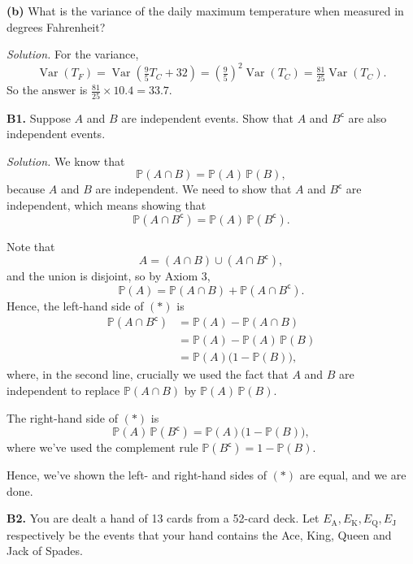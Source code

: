 \documentclass[
  a4paper,
]{book}
\theoremstyle{definition}
\theoremstyle{definition}
\theoremstyle{definition}
\theoremstyle{definition}
\theoremstyle{remark}
\begin{document}
\textbf{(b)} What is the variance of the daily maximum temperature when measured in degrees Fahrenheit?

\begin{myanswers}
\emph{Solution.}
For the variance,
\[ \operatorname{Var}(T_F) = \operatorname{Var}\left(\tfrac95T_C + 32\right) = \left(\tfrac95\right)^2 \operatorname{Var}(T_C) = \tfrac{81}{25}\operatorname{Var}(T_C). \]
So the answer is \(\frac{81}{25} \times 10.4 = 33.7\).

\end{myanswers}

\textbf{B1.} Suppose \(A\) and \(B\) are independent events. Show that \(A\) and \(B^\mathsf{c}\) are also independent events.

\begin{myanswers}
\emph{Solution.} We know that
\[ \mathbb P(A \cap B) = \mathbb P(A) \, \mathbb P(B) , \]
because \(A\) and \(B\) are independent.
We need to show that \(A\) and \(B^\mathsf{c}\) are independent, which means showing that
\[ \mathbb P(A \cap B^\mathsf{c}) = \mathbb P(A) \, \mathbb P(B^\mathsf{c}) . \tag{$*$} \]

Note that
\[ A = (A \cap B) \cup (A \cap B^\mathsf{c}) , \]
and the union is disjoint, so by Axiom 3,
\[ \mathbb P(A) = \mathbb P(A \cap B) + \mathbb P(A \cap B^\mathsf{c}) . \]
Hence, the left-hand side of \((*)\) is
\begin{align*}
\mathbb P(A \cap B^\mathsf{c})
&= \mathbb P(A) - \mathbb P(A \cap B) \\
&= \mathbb P(A) - \mathbb P(A)\,\mathbb P(B) \\
&= \mathbb P(A) \big(1 - \mathbb P(B)\big) ,
\end{align*}
where, in the second line, crucially we used the fact that \(A\) and \(B\) are independent to replace \(\mathbb P(A \cap B)\) by \(\mathbb P(A)\,\mathbb P(B)\).

The right-hand side of \((*)\) is
\[\mathbb P(A) \, \mathbb P(B^\mathsf{c}) = \mathbb P(A) \big(1 - \mathbb P(B)\big) , \]
where we've used the complement rule \(\mathbb P(B^\mathsf{c}) = 1- \mathbb P(B)\).

Hence, we've shown the left- and right-hand sides of \((*)\) are equal, and we are done.

\end{myanswers}

\textbf{B2.} You are dealt a hand of 13 cards from a 52-card deck. Let \(E_\mathrm{A}, E_\mathrm{K}, E_\mathrm{Q}, E_\mathrm{J}\) respectively be the events that your hand contains the Ace, King, Queen and Jack of Spades.
\end{document}
